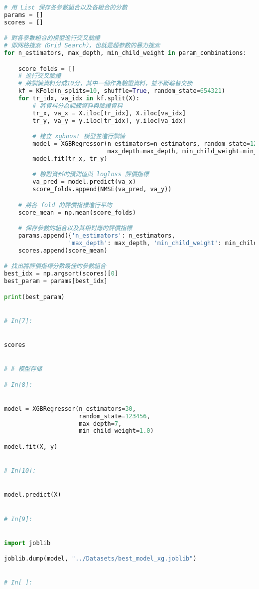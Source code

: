 \documentclass[withoutpreface,bwprint]{cumcmthesis}
\begin{document}
\begin{appendices}
\begin{lstlisting}[language=Python]
# 用 List 保存各參數組合以及各組合的分數
params = []
scores = []

# 對各參數組合的模型進行交叉驗證
# 即网格搜索（Grid Search），也就是超参数的暴力搜索
for n_estimators, max_depth, min_child_weight in param_combinations:

    score_folds = []
    # 進行交叉驗證
    # 將訓練資料分成10分，其中一個作為驗證資料，並不斷輪替交換
    kf = KFold(n_splits=10, shuffle=True, random_state=654321)
    for tr_idx, va_idx in kf.split(X):
        # 將資料分為訓練資料與驗證資料
        tr_x, va_x = X.iloc[tr_idx], X.iloc[va_idx]
        tr_y, va_y = y.iloc[tr_idx], y.iloc[va_idx]

        # 建立 xgboost 模型並進行訓練
        model = XGBRegressor(n_estimators=n_estimators, random_state=123456,
                             max_depth=max_depth, min_child_weight=min_child_weight)
        model.fit(tr_x, tr_y)

        # 驗證資料的預測值與 logloss 評價指標
        va_pred = model.predict(va_x)
        score_folds.append(NMSE(va_pred, va_y))

    # 將各 fold 的評價指標進行平均
    score_mean = np.mean(score_folds)

    # 保存參數的組合以及其相對應的評價指標
    params.append({'n_estimators': n_estimators,
                  'max_depth': max_depth, 'min_child_weight': min_child_weight})
    scores.append(score_mean)

# 找出將評價指標分數最佳的參數組合
best_idx = np.argsort(scores)[0]
best_param = params[best_idx]

print(best_param)


# In[7]:


scores


# # 模型存储

# In[8]:


model = XGBRegressor(n_estimators=30,
                     random_state=123456,
                     max_depth=7,
                     min_child_weight=1.0)

model.fit(X, y)


# In[10]:


model.predict(X)


# In[9]:


import joblib

joblib.dump(model, "../Datasets/best_model_xg.joblib")


# In[ ]:






\end{lstlisting}
\end{appendices}
\end{document}
